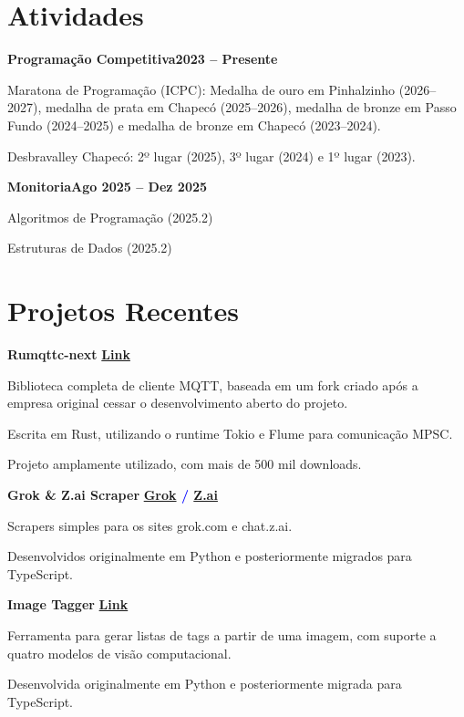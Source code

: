 \documentclass[a4paper,10pt]{article}
\newcommand{\heading}[2]{
\hspace{10pt}#1\hfill#2\\
}
\newcommand{\headingBf}[2]{
\heading{\textbf{#1}}{\textbf{#2}}
}
\newenvironment{resume_list}{
\vspace{-7pt}
\begin{itemize}[itemsep=-2px, parsep=1pt, leftmargin=30pt]
}{
\end{itemize}
}
\begin{document}

\section{Atividades}

\headingBf{Programação Competitiva}{2023 -- Presente}
\begin{resume_list}
\item Maratona de Programação (ICPC): Medalha de ouro em Pinhalzinho (2026--2027), medalha de prata em Chapecó (2025--2026), medalha de bronze em Passo Fundo (2024--2025) e medalha de bronze em Chapecó (2023--2024).
\item Desbravalley Chapecó:  2º lugar (2025), 3º lugar (2024) e 1º lugar (2023).
\end{resume_list}

\headingBf{Monitoria}{Ago 2025 -- Dez 2025}
\begin{resume_list}
\item Algoritmos de Programação (2025.2)
\item Estruturas de Dados (2025.2)
\end{resume_list}


\section{Projetos Recentes}

\headingBf{Rumqttc-next}{
\textcolor{blue}{
\href{https://github.com/thehouseisonfire/rumqtt/}{Link}
}
}
\begin{resume_list}
\item Biblioteca completa de cliente MQTT, baseada em um fork criado após a empresa original cessar o desenvolvimento aberto do projeto.
\item Escrita em Rust, utilizando o runtime Tokio e Flume para comunicação MPSC.
\item Projeto amplamente utilizado, com mais de 500 mil downloads.
\end{resume_list}

\headingBf{Grok \& Z.ai Scraper}{
\textcolor{blue}{
\href{https://github.com/thehouseisonfire/grok-scraper}{Grok} /
\href{https://github.com/thehouseisonfire/zai-scraper}{Z.ai}
}
}
\begin{resume_list}
\item Scrapers simples para os sites grok.com e chat.z.ai.
\item Desenvolvidos originalmente em Python e posteriormente migrados para TypeScript.
\end{resume_list}

\headingBf{Image Tagger}{
\textcolor{blue}{
\href{https://github.com/thehouseisonfire/image-tagger}{Link}
}
}
\begin{resume_list}
\item Ferramenta para gerar listas de tags a partir de uma imagem, com suporte a quatro modelos de visão computacional.
\item Desenvolvida originalmente em Python e posteriormente migrada para TypeScript.
\end{resume_list}
\end{document}
